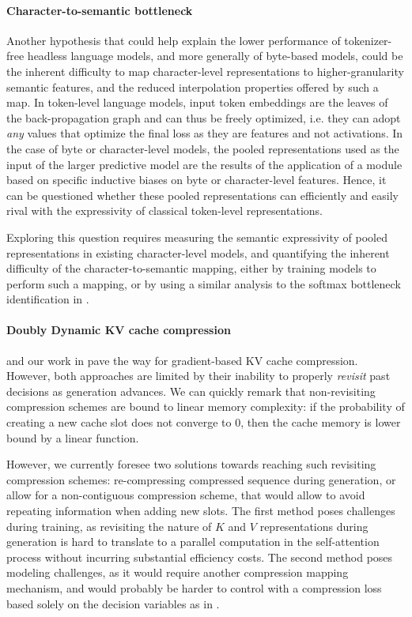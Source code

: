 \paragraph{Character-to-semantic bottleneck} Another hypothesis that could help explain the lower performance of tokenizer-free headless language models, and more generally of byte-based models, could be the inherent difficulty to map character-level representations to higher-granularity semantic features, and the reduced interpolation properties offered by such a map. In token-level language models, input token embeddings are the leaves of the back-propagation graph and can thus be freely optimized, i.e. they can adopt \textit{any} values that optimize the final loss as they are features and not activations. In the case of byte or character-level models, the pooled representations used as the input of the larger predictive model are the results of the application of a module based on specific inductive biases on byte or character-level features. Hence, it can be questioned whether these pooled representations can efficiently and easily rival with the expressivity of classical token-level representations.

Exploring this question requires measuring the semantic expressivity of pooled representations in existing character-level models, and quantifying the inherent difficulty of the character-to-semantic mapping, either by training models to perform such a mapping, or by using a similar analysis to the softmax bottleneck identification in .

\paragraph{Doubly Dynamic KV cache compression} \citet{nawrot2024dynamic} and our work in  pave the way for gradient-based KV cache compression. However, both approaches are limited by their inability to properly \textit{revisit} past decisions as generation advances. We can quickly remark that non-revisiting compression schemes are bound to linear memory complexity: if the probability of creating a new cache slot does not converge to $0$, then the cache memory is lower bound by a linear function.

However, we currently foresee two solutions towards reaching such revisiting compression schemes: re-compressing compressed sequence during generation, or allow for a non-contiguous compression scheme, that would allow to avoid repeating information when adding new slots. The first method poses challenges during training, as revisiting the nature of $K$ and $V$ representations during generation is hard to translate to a parallel computation in the self-attention process without incurring substantial efficiency costs. The second method poses modeling challenges, as it would require another compression mapping mechanism, and would probably be harder to control with a compression loss based solely on the decision variables as in .

